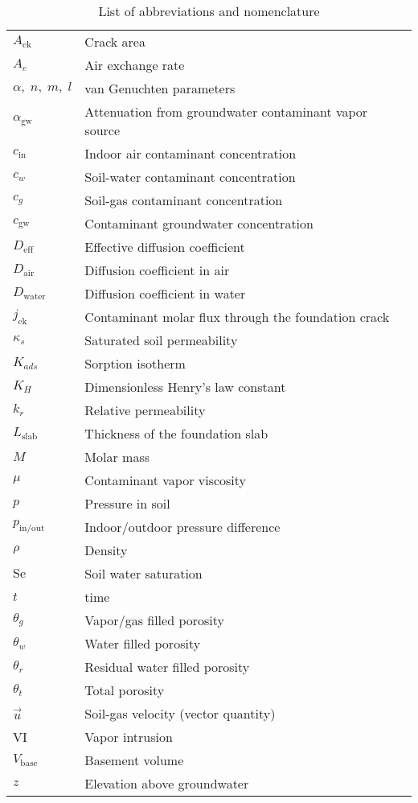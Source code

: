 \clearpage
\begin{table}[htb!]
  \centering
  \begin{tabular}{l l}
    \toprule
    $A_\mathrm{ck}$ & Crack area \\
    $A_e$ & Air exchange rate \\
    $\alpha, \; n, \; m, \; l$ & van Genuchten parameters \\
    $\alpha_\mathrm{gw}$ & Attenuation from groundwater contaminant vapor source \\
    $c_\mathrm{in}$ & Indoor air contaminant concentration \\
    $c_w$ & Soil-water contaminant concentration \\
    $c_g$ & Soil-gas contaminant concentration \\
    $c_\mathrm{gw}$ & Contaminant groundwater concentration \\
    $D_\mathrm{eff}$ & Effective diffusion coefficient \\
    $D_\mathrm{air}$ & Diffusion coefficient in air \\
    $D_\mathrm{water}$ & Diffusion coefficient in water \\
    $j_\mathrm{ck}$ & Contaminant molar flux through the foundation crack \\
    $\kappa_s$ & Saturated soil permeability \\
    $K_{ads}$ & Sorption isotherm \\
    $K_H$ & Dimensionless Henry's law constant \\
    $k_r$ & Relative permeability \\
    $L_\mathrm{slab}$ & Thickness of the foundation slab \\
    $M$ & Molar mass \\
    $\mu$ & Contaminant vapor viscosity \\
    $p$ & Pressure in soil \\
    $p_\mathrm{in/out}$ & Indoor/outdoor pressure difference \\
    $\rho$ & Density \\
    $\mathrm{Se}$ & Soil water saturation \\
    $t$ & time \\
    $\theta_g$ & Vapor/gas filled porosity \\
    $\theta_w$ & Water filled porosity \\
    $\theta_r$ & Residual water filled porosity \\
    $\theta_t$ & Total porosity \\
    $\vec{u}$ & Soil-gas velocity (vector quantity) \\
    VI & Vapor intrusion \\
    $V_\mathrm{base}$ & Basement volume \\
    $z$ & Elevation above groundwater \\
    \bottomrule
  \end{tabular}
  \caption{List of abbreviations and nomenclature}\label{tbl:abbreviations}
\end{table}
